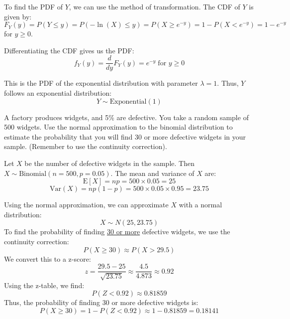 \documentclass[a4paper, 10pt]{article}
\begin{document}
\begin{solution}
To find the PDF of \( Y \), we can use the method of transformation. The CDF of \( Y \) is given by:
\[
F_Y(y) = P(Y \leq y) = P(-\ln(X) \leq y) = P(X \geq e^{-y}) = 1 - P(X < e^{-y}) = 1 - e^{-y}
\]
for \( y \geq 0 \).

Differentiating the CDF gives us the PDF:
\[
\boxed{f_Y(y) = \frac{d}{dy} F_Y(y) = e^{-y}} \; \text{for } y \geq 0
\]

This is the PDF of the exponential distribution with parameter \( \lambda = 1 \). Thus, \( Y \) follows an exponential distribution:
\[
\boxed{Y \sim \text{Exponential}(1)}
\]
\end{solution}


\begin{problem}
A factory produces widgets, and 5\% are defective. You take a random sample of 500 widgets.
Use the normal approximation to the binomial distribution to estimate the probability that you will find 30 or more defective widgets in your sample.
(Remember to use the continuity correction).
\end{problem}

\begin{solution}
Let \( X \) be the number of defective widgets in the sample. Then \( X \sim \text{Binomial}(n=500, p=0.05) \).
The mean and variance of \( X \) are:
\[ \text{E}[X] = np = 500 \times 0.05 = 25 \]
\[ \text{Var}(X) = np(1-p) = 500 \times 0.05 \times 0.95 = 23.75 \]

Using the normal approximation, we can approximate \( X \) with a normal distribution:
\[ X \sim N(25, 23.75) \]
To find the probability of finding \underline{30 or more} defective widgets, we use the continuity correction:
\[ P(X \geq 30) \approx P(X > 29.5) \]
We convert this to a z-score:
\[ z = \frac{29.5 - 25}{\sqrt{23.75}} \approx \frac{4.5}{4.873} \approx 0.92 \]
Using the z-table, we find:
\[ P(Z < 0.92) \approx 0.81859 \]
Thus, the probability of finding 30 or more defective widgets is:
\[ P(X \geq 30) = 1 - P(Z < 0.92) \approx 1 - 0.81859 = \boxed{0.18141} \]
\end{solution}
\end{document}

